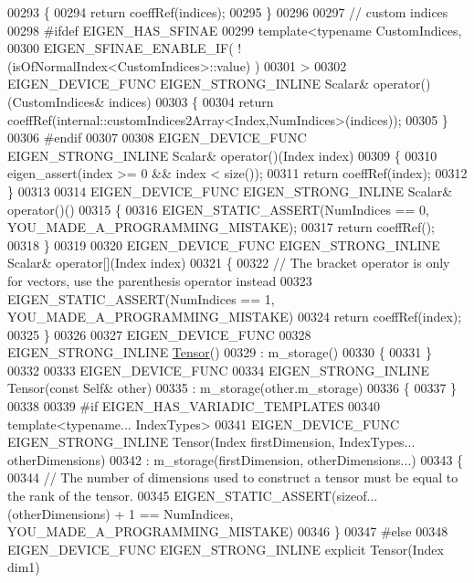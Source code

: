 \begin{DoxyCode}
00293     \{
00294       \textcolor{keywordflow}{return} coeffRef(indices);
00295     \}
00296 
00297     \textcolor{comment}{// custom indices}
00298 \textcolor{preprocessor}{#ifdef EIGEN\_HAS\_SFINAE}
00299     \textcolor{keyword}{template}<\textcolor{keyword}{typename} CustomIndices,
00300              EIGEN\_SFINAE\_ENABLE\_IF( !(isOfNormalIndex<CustomIndices>::value) )
00301     >
00302     EIGEN\_DEVICE\_FUNC EIGEN\_STRONG\_INLINE Scalar& operator()(CustomIndices& indices)
00303     \{
00304       \textcolor{keywordflow}{return} coeffRef(internal::customIndices2Array<Index,NumIndices>(indices));
00305     \}
00306 \textcolor{preprocessor}{#endif}
00307 
00308     EIGEN\_DEVICE\_FUNC EIGEN\_STRONG\_INLINE Scalar& operator()(Index index)
00309     \{
00310       eigen\_assert(index >= 0 && index < size());
00311       \textcolor{keywordflow}{return} coeffRef(index);
00312     \}
00313 
00314     EIGEN\_DEVICE\_FUNC EIGEN\_STRONG\_INLINE Scalar& operator()()
00315     \{
00316       EIGEN\_STATIC\_ASSERT(NumIndices == 0, YOU\_MADE\_A\_PROGRAMMING\_MISTAKE);
00317       \textcolor{keywordflow}{return} coeffRef();
00318     \}
00319 
00320     EIGEN\_DEVICE\_FUNC EIGEN\_STRONG\_INLINE Scalar& operator[](Index index)
00321     \{
00322       \textcolor{comment}{// The bracket operator is only for vectors, use the parenthesis operator instead}
00323       EIGEN\_STATIC\_ASSERT(NumIndices == 1, YOU\_MADE\_A\_PROGRAMMING\_MISTAKE)
00324       \textcolor{keywordflow}{return} coeffRef(index);
00325     \}
00326 
00327     EIGEN\_DEVICE\_FUNC
00328     EIGEN\_STRONG\_INLINE \hyperlink{class_eigen_1_1_tensor}{Tensor}()
00329       : m\_storage()
00330     \{
00331     \}
00332 
00333     EIGEN\_DEVICE\_FUNC
00334     EIGEN\_STRONG\_INLINE Tensor(\textcolor{keyword}{const} Self& other)
00335       : m\_storage(other.m\_storage)
00336     \{
00337     \}
00338 
00339 \textcolor{preprocessor}{#if EIGEN\_HAS\_VARIADIC\_TEMPLATES}
00340     \textcolor{keyword}{template}<\textcolor{keyword}{typename}... IndexTypes>
00341     EIGEN\_DEVICE\_FUNC EIGEN\_STRONG\_INLINE Tensor(Index firstDimension, IndexTypes... otherDimensions)
00342         : m\_storage(firstDimension, otherDimensions...)
00343     \{
00344       \textcolor{comment}{// The number of dimensions used to construct a tensor must be equal to the rank of the tensor.}
00345       EIGEN\_STATIC\_ASSERT(\textcolor{keyword}{sizeof}...(otherDimensions) + 1 == NumIndices, YOU\_MADE\_A\_PROGRAMMING\_MISTAKE)
00346     \}
00347 \textcolor{preprocessor}{#else}
00348     EIGEN\_DEVICE\_FUNC EIGEN\_STRONG\_INLINE \textcolor{keyword}{explicit} Tensor(Index dim1)

\end{DoxyCode}
